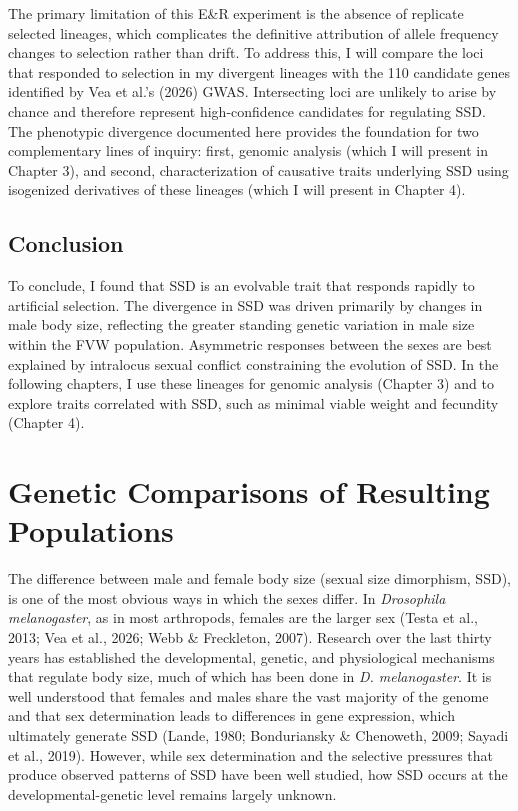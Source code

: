 \documentclass[12pt,reqno,oneside]{report}
\begin{document}
The primary limitation of this E\&R experiment is the absence of replicate selected lineages, which complicates the definitive attribution of allele frequency changes to selection rather than drift. To address this, I will compare the loci that responded to selection in my divergent lineages with the 110 candidate genes identified by Vea et al.'s (2026) GWAS. Intersecting loci are unlikely to arise by chance and therefore represent high-confidence candidates for regulating SSD. The phenotypic divergence documented here provides the foundation for two complementary lines of inquiry: first, genomic analysis (which I will present in Chapter 3), and second, characterization of causative traits underlying SSD using isogenized derivatives of these lineages (which I will present in Chapter 4).

\section{Conclusion}

To conclude, I found that SSD is an evolvable trait that responds rapidly to artificial selection. The divergence in SSD was driven primarily by changes in male body size, reflecting the greater standing genetic variation in male size within the FVW population. Asymmetric responses between the sexes are best explained by intralocus sexual conflict constraining the evolution of SSD. In the following chapters, I use these lineages for genomic analysis (Chapter 3) and to explore traits correlated with SSD, such as minimal viable weight and fecundity (Chapter 4).

\newpage
\chapter{Genetic Comparisons of Resulting Populations}

The difference between male and female body size (sexual size dimorphism, SSD), is one of the most obvious ways in which the sexes differ. In \textit{Drosophila melanogaster}, as in most arthropods, females are the larger sex (Testa et al., 2013; Vea et al., 2026; Webb \& Freckleton, 2007). Research over the last thirty years has established the developmental, genetic, and physiological mechanisms that regulate body size, much of which has been done in \textit{D. melanogaster}. It is well understood that females and males share the vast majority of the genome and that sex determination leads to differences in gene expression, which ultimately generate SSD (Lande, 1980; Bonduriansky \& Chenoweth, 2009; Sayadi et al., 2019). However, while sex determination and the selective pressures that produce observed patterns of SSD have been well studied, how SSD occurs at the developmental-genetic level remains largely unknown.
\end{document}
